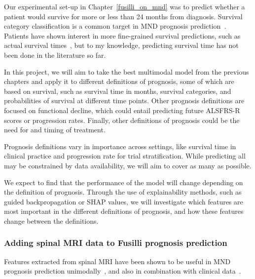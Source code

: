 Our experimental set-up in Chapter~\ref{fusilli_on_mnd} was to predict whether a patient would survive for more or less than 24 months from diagnosis.
Survival category classification is a common target in MND prognosis prediction~\cite{ongPredictingFunctionalDecline2017,grollemundDevelopmentValidation1year2020, schusterSurvivalPredictionAmyotrophic2017, vanderburghDeepLearningPredictions2017}.
Patients have shown interest in more fine-grained survival predictions, such as actual survival times~\cite{westenengPrognosisPatientsAmyotrophic2018}, but to my knowledge, predicting survival time has not been done in the literature so far.

In this project, we will aim to take the best multimodal model from the previous chapters and apply it to different definitions of prognosis, some of which are based on survival, such as survival time in months, survival categories, and probabilities of survival at different time points.
Other prognosis definitions are focused on functional decline, which could entail predicting future ALSFRS-R scores or progression rates.
Finally, other definitions of prognosis could be the need for and timing of treatment.

Prognosis definitions vary in importance across settings, like survival time in clinical practice and progression rate for trial stratification. While predicting all may be constrained by data availability, we will aim to cover as many as possible.

We expect to find that the performance of the model will change depending on the definition of prognosis.
Through the use of explainability methods, such as guided backpropagation or SHAP values, we will investigate which features are most important in the different definitions of prognosis, and how these features change between the definitions.


\subsubsection*{Adding spinal MRI data to Fusilli prognosis prediction}

Features extracted from spinal MRI have been shown to be useful in MND prognosis prediction unimodally~\cite{brancoSpinalCordAtrophy2014, grolezMRICervicalSpinal2018}, and also in combination with clinical data~\cite{querinSpinalCordMultiparametric2017}.

